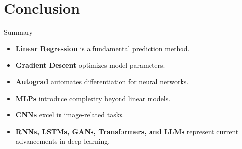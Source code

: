 \documentclass{beamer}
\begin{document}
\section{Conclusion}
\begin{frame}{Summary}
    \begin{itemize}
        \item \textbf{Linear Regression} is a fundamental prediction method.
        \item \textbf{Gradient Descent} optimizes model parameters.
        \item \textbf{Autograd} automates differentiation for neural networks.
        \item \textbf{MLPs} introduce complexity beyond linear models.
        \item \textbf{CNNs} excel in image-related tasks.
        \item \textbf{RNNs, LSTMs, GANs, Transformers, and LLMs} represent current advancements in deep learning.
    \end{itemize}
\end{frame}
\end{document}
